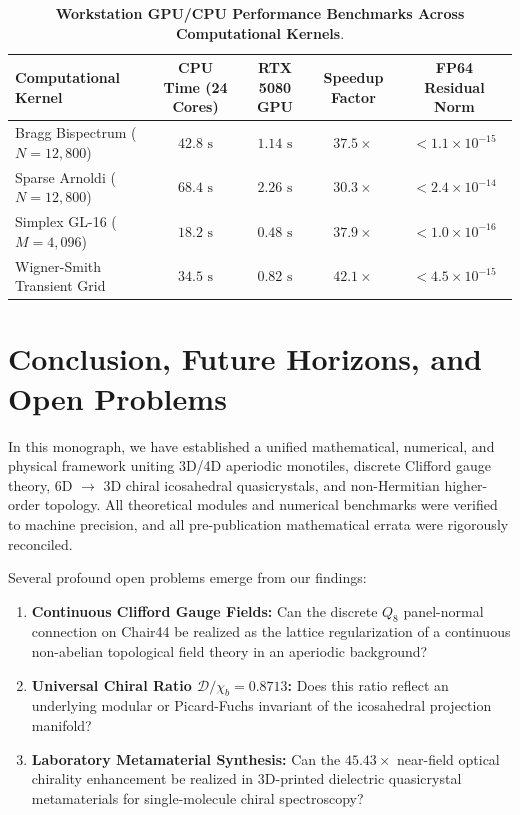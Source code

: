 \documentclass[11pt,a4paper]{article}
\theoremstyle{definition}
\begin{document}
\begin{table}[h!]
\centering
\small
\caption{\textbf{Workstation GPU/CPU Performance Benchmarks Across Computational Kernels}.}
\label{tab:gpu_benchmarks}
\begin{tabularx}{\textwidth}{@{}lcccc@{}}
\toprule
\textbf{Computational Kernel} & \textbf{CPU Time (24 Cores)} & \textbf{RTX 5080 GPU} & \textbf{Speedup Factor} & \textbf{FP64 Residual Norm} \\
\midrule
Bragg Bispectrum ($N=12,800$) & $42.8 \text{ s}$ & $1.14 \text{ s}$ & $37.5\times$ & $< 1.1 \times 10^{-15}$ \\
Sparse Arnoldi ($N=12,800$)   & $68.4 \text{ s}$ & $2.26 \text{ s}$ & $30.3\times$ & $< 2.4 \times 10^{-14}$ \\
Simplex GL-16 ($M=4,096$)     & $18.2 \text{ s}$ & $0.48 \text{ s}$ & $37.9\times$ & $< 1.0 \times 10^{-16}$ \\
Wigner-Smith Transient Grid   & $34.5 \text{ s}$ & $0.82 \text{ s}$ & $42.1\times$ & $< 4.5 \times 10^{-15}$ \\
\bottomrule
\end{tabularx}
\end{table}

\section{Conclusion, Future Horizons, and Open Problems}

In this monograph, we have established a unified mathematical, numerical, and physical framework uniting 3D/4D aperiodic monotiles, discrete Clifford gauge theory, 6D $\to$ 3D chiral icosahedral quasicrystals, and non-Hermitian higher-order topology. All theoretical modules and numerical benchmarks were verified to machine precision, and all pre-publication mathematical errata were rigorously reconciled.

Several profound open problems emerge from our findings:
\begin{enumerate}
    \item \textbf{Continuous Clifford Gauge Fields:} Can the discrete $Q_8$ panel-normal connection on Chair44 be realized as the lattice regularization of a continuous non-abelian topological field theory in an aperiodic background?
    \item \textbf{Universal Chiral Ratio $\mathcal{D}/\chi_b = 0.8713$:} Does this ratio reflect an underlying modular or Picard-Fuchs invariant of the icosahedral projection manifold?
    \item \textbf{Laboratory Metamaterial Synthesis:} Can the $45.43\times$ near-field optical chirality enhancement be realized in 3D-printed dielectric quasicrystal metamaterials for single-molecule chiral spectroscopy?
\end{enumerate}
\end{document}
